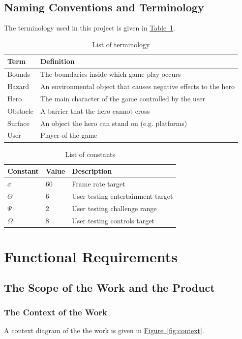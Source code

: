 \documentclass[12pt, titlepage]{article}
\begin{document}
\subsection{Naming Conventions and Terminology}
The terminology used in this project is given in \hyperref[tab:terminology]{Table~\ref*{tab:terminology}}.
\begin{table}[h]
\caption{List of terminology} \label{tab:terminology}
\begin{tabularx}{\textwidth}{p{3cm}X}
\toprule {\bf Term} & {\bf Definition}\\
\midrule
Bounds & The boundaries inside which game play occurs\\
Hazard & An environmental object that causes negative effects to the hero\\
Hero & The main character of the game controlled by the user\\
Obstacle & A barrier that the hero cannot cross\\
Surface & An object the hero can stand on (e.g. platforms)\\
User & Player of the game\\
\bottomrule
\end{tabularx}
\end{table}

\begin{table}[ht]
\caption{List of constants} \label{tab:constants}
\begin{tabularx}{\textwidth}{p{3cm}p{2cm}X}
\toprule {\bf Constant} & {\bf Value} & {\bf Description}\\
\midrule
$\sigma$ & 60 & Frame rate target\\
$\Theta$ & 6 & User testing entertainment target\\
$\Psi$ & 2 & User testing challenge range\\
$\Omega$ & 8 & User testing controls target\\
\bottomrule
\end{tabularx}
\end{table}

\newpage
\section{Functional Requirements}
\subsection{The Scope of the Work and the Product}

\subsubsection{The Context of the Work}
A context diagram of the the work is given in \hyperref[fig:context]{Figure~\ref*{fig:context}}.
\end{document}
